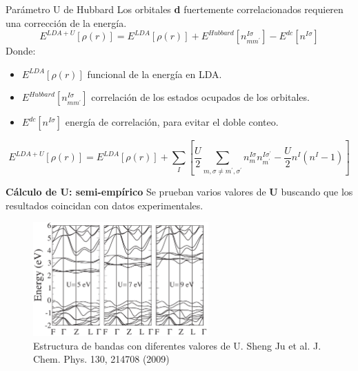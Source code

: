 \begin{frame}{Par\'ametro U de Hubbard}
    Los orbitales \textbf{d} fuertemente correlacionados requieren una correcci\'on de la energ\'ia.
    \[
    E^{LDA+U} [\rho (r)]= E^{LDA} [\rho (r)] + 
    E^{Hubbard}[n_{mm^{\prime}}^{I\sigma}] - E^{dc}[n^{I\sigma}]
    \]
    Donde:
    
    \begin{itemize}
        \item $E^{LDA} [\rho (r)]$ funcional de la energ\'ia en LDA.
        \item $E^{Hubbard}[n_{mm^{\prime}}^{I\sigma}]$ correlaci\'on de los estados ocupados de los orbitales.
        \item $E^{dc}[n^{I\sigma}]$ energ\'ia de correlaci\'on, para evitar el doble conteo.
    \end{itemize}
\[
E^{LDA+U} [\rho (r)]= E^{LDA} [\rho (r)] + \sum _{I} \left[ \frac{U}{2} \sum 
_{m,\sigma \neq m^{\prime},\sigma ^{\prime}} n_{m}^{I\sigma} 
n_{m^{\prime}}^{I\sigma ^{\prime}} - \frac{U}{2} n^{I}(n^{I}-1) \right]
\]
\end{frame}

\begin{frame}
    {\bf C\'alculo de U: semi-emp\'irico}
    Se prueban varios valores de {\bf U} buscando que los resultados coincidan con datos experimentales.
    \begin{figure}[H]
        \centering
        \includegraphics[width=0.6\textwidth]{contenido/teoria/img_teoria/hubbars.png}
        \caption{Estructura de bandas con diferentes valores de U. Sheng Ju et al. J. Chem. Phys. 130, 214708 (2009)}
    \end{figure}
\end{frame}

